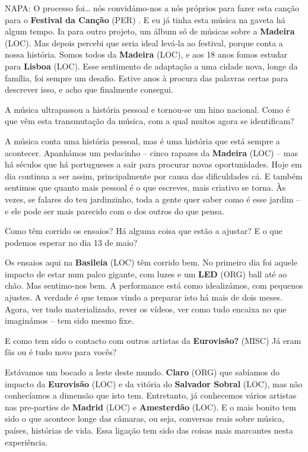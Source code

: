 \documentclass[12pt,a4paper]{article}
\begin{document}
NAPA: O processo foi… nós convidámo-nos a nós próprios para fazer esta canção para o \textbf{Festival da Canção} (PER) . E eu já tinha esta música na gaveta há algum tempo. Ia para outro projeto, um álbum só de músicas sobre a \textbf{Madeira} (LOC). Mas depois percebi que seria ideal levá-la ao festival, porque conta a nossa história. Somos todos da \textbf{Madeira} (LOC), e aos 18 anos fomos estudar para \textbf{Lisboa} (LOC). Esse sentimento de adaptação a uma cidade nova, longe da família, foi sempre um desafio. Estive anos à procura das palavras certas para descrever isso, e acho que finalmente consegui.



A música ultrapassou a história pessoal e tornou-se um hino nacional. Como é que vêm esta transmutação da música, com a qual muitos agora se identificam?



A música conta uma história pessoal, mas é uma história que está sempre a acontecer. Apanhámos um pedacinho -- cinco rapazes da \textbf{Madeira} (LOC) -- mas há séculos que há portugueses a sair para procurar novas oportunidades. Hoje em dia continua a ser assim, principalmente por causa das dificuldades cá. E também sentimos que quanto mais pessoal é o que escreves, mais criativo se torna. Às vezes, se falares do teu jardinzinho, toda a gente quer saber como é esse jardim -- e ele pode ser mais parecido com o dos outros do que pensa.



Como têm corrido os ensaios? Há alguma coisa que estão a ajustar? E o que podemos esperar no dia 13 de maio?



Os ensaios aqui na \textbf{Basileia} (LOC) têm corrido bem. No primeiro dia foi aquele impacto de estar num palco gigante, com luzes e um \textbf{LED} (ORG) ball até ao chão. Mas sentimo-nos bem. A performance está como idealizámos, com pequenos ajustes. A verdade é que temos vindo a preparar isto há mais de dois meses. Agora, ver tudo materializado, rever os vídeos, ver como tudo encaixa no que imaginámos -- tem sido mesmo fixe.



E como tem sido o contacto com outros artistas da \textbf{Eurovisão?} (MISC) Já eram fãs ou é tudo novo para vocês?



Estávamos um bocado a leste deste mundo. \textbf{Claro} (ORG) que sabíamos do impacto da \textbf{Eurovisão} (LOC) e da vitória do \textbf{Salvador Sobral} (LOC), mas não conhecíamos a dimensão que isto tem. Entretanto, já conhecemos vários artistas nas pre-parties de \textbf{Madrid} (LOC) e \textbf{Amesterdão} (LOC). E o mais bonito tem sido o que acontece longe das câmaras, ou seja, conversas reais sobre música, países, histórias de vida. Essa ligação tem sido das coisas mais marcantes nesta experiência.
\end{document}
